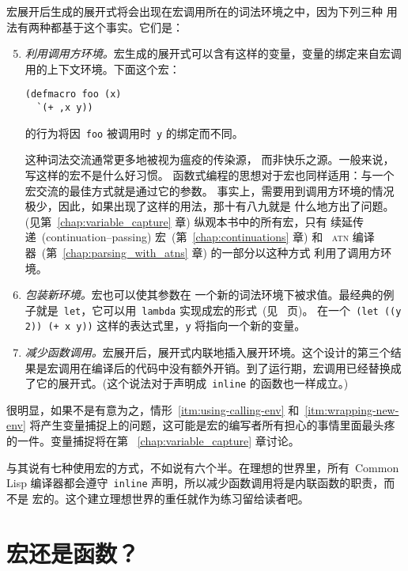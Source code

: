 宏展开后生成的展开式将会出现在宏调用所在的词法环境之中，因为下列三种
用法有两种都基于这个事实。它们是：
\begin{enumerate}
\setcounter{enumi}{4}
\item\label{itm:using-calling-env} \emph{利用调用方环境。}宏生成的展开式可以含有这样的变量，变量的绑定来自宏调用的上下文环境。下面这个宏：
\begin{lstlisting}
(defmacro foo (x)
  `(+ ,x y))
\end{lstlisting}
的行为将因~\verb|foo| 被调用时~\verb|y| 的绑定而不同。

这种词法交流通常更多地被视为瘟疫的传染源，
而非快乐之源。一般来说，写这样的宏不是什么好习惯。
函数式编程的思想对于宏也同样适用：与一个宏交流的最佳方式就是通过它的参数。
事实上，需要用到调用方环境的情况极少，因此，如果出现了这样的用法，那十有八九就是
什么地方出了问题。(见第~\ref{chap:variable_capture} 章) 纵观本书中的所有宏，只有
续延传递~(continuation--passing) 宏~(第~\ref{chap:continuations} 章) 和
~\textsc{atn} 编译器~(第~\ref{chap:parsing_with_atns} 章) 的一部分以这种方式
利用了调用方环境。

\item\label{itm:wrapping-new-env} \emph{包装新环境。}宏也可以使其参数在
一个新的词法环境下被求值。最经典的例子就是~\verb|let|，它可以用~\verb|lambda|
实现成宏的形式~(见~\pageref{fig:macro_implementation_of_let} 页)。
在一个~\verb|(let ((y 2)) (+ x y))| 这样的表达式里，\verb|y| 将指向一个新的变量。

\item \emph{减少函数调用。}宏展开后，展开式内联地插入展开环境。这个设计的第三个结果是宏调用在编译后的代码中没有额外开销。到了运行期，宏调用已经替换成了它的展开式。(这个说法对于声明成~\verb|inline| 的函数也一样成立。)
\end{enumerate}
很明显，如果不是有意为之，情形~\ref{itm:using-calling-env} 和~\ref{itm:wrapping-new-env} 将产生变量捕捉上的问题，这可能是宏的编写者所有担心的事情里面最头疼的一件。变量捕捉将在第
~\ref{chap:variable_capture} 章讨论。

与其说有七种使用宏的方式，不如说有六个半。在理想的世界里，所有~Common Lisp
编译器都会遵守~\verb|inline| 声明，所以减少函数调用将是内联函数的职责，而不是
宏的。这个建立理想世界的重任就作为练习留给读者吧。

\section{宏还是函数？}
\label{sec:macro_or_function}

